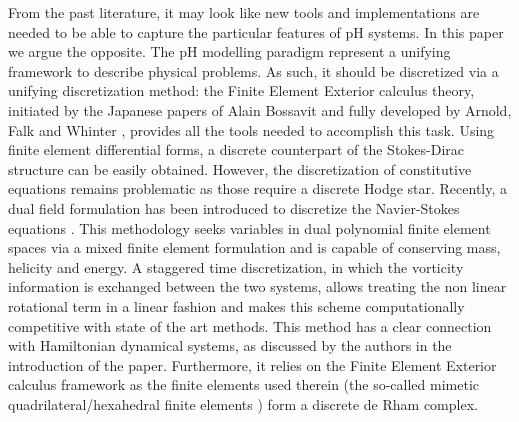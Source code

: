 \documentclass{elsarticle}
\newcommand{\revTwo}[1]{{\color{black}#1}}
\begin{document}
From the past literature, it may look like new tools and implementations are needed to be able to capture the particular features of pH systems. In this paper we argue the opposite. The pH modelling paradigm represent a unifying framework to describe physical problems. As such, it should be discretized via a unifying discretization method: the Finite Element Exterior calculus theory, \revTwo{initiated by the Japanese papers of Alain Bossavit and fully developed by Arnold,  Falk and Whinter}  \cite{arnold2006acta}, provides all the tools needed to accomplish this task. Using finite element differential forms, a discrete counterpart of the Stokes-Dirac structure can be easily obtained. However, the discretization of constitutive equations remains problematic as those require a discrete Hodge star. Recently, a dual field formulation has been introduced to discretize the Navier-Stokes equations \cite{zhang2021mass}. This methodology seeks variables in dual polynomial finite element spaces via a mixed finite element formulation and is capable of conserving mass, helicity and energy. A staggered time discretization, in which the vorticity information is exchanged between the two systems, allows treating the non linear rotational term in a linear fashion and makes this scheme computationally competitive with state of the art methods. 
This method has a clear connection with Hamiltonian dynamical systems, as discussed by the authors in the introduction of the paper. Furthermore, it relies on the Finite Element Exterior calculus framework as the finite elements used therein (the so-called mimetic quadrilateral/hexahedral finite elements \cite{palha2014mimetic}) form a discrete de Rham complex. \\
\end{document}
